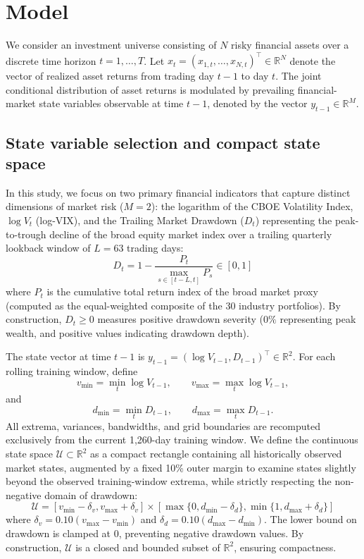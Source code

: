 \documentclass[smallextended]{svjour3}
\begin{document}
\section{Model}
We consider an investment universe consisting of $N$ risky financial assets over a discrete time horizon $t = 1, \dots, T$. Let $x_t = (x_{1,t}, \dots, x_{N,t})^\top \in \mathbb{R}^N$ denote the vector of realized asset returns from trading day $t-1$ to day $t$. The joint conditional distribution of asset returns is modulated by prevailing financial-market state variables observable at time $t-1$, denoted by the vector $y_{t-1} \in \mathbb{R}^M$.

\subsection{State variable selection and compact state space}
In this study, we focus on two primary financial indicators that capture distinct dimensions of market risk ($M = 2$): the logarithm of the CBOE Volatility Index, $\log V_t$ (log-VIX), and the Trailing Market Drawdown ($D_t$) representing the peak-to-trough decline of the broad equity market index over a trailing quarterly lookback window of $L = 63$ trading days:
\begin{equation}
    D_t = 1 - \frac{P_t}{\max_{s \in [t-L, t]} P_s} \in [0, 1]
\end{equation}
where $P_t$ is the cumulative total return index of the broad market proxy (computed as the equal-weighted composite of the 30 industry portfolios). By construction, $D_t \ge 0$ measures positive drawdown severity ($0\%$ representing peak wealth, and positive values indicating drawdown depth).

The state vector at time $t-1$ is $y_{t-1} = (\log V_{t-1}, D_{t-1})^\top \in \mathbb{R}^2$. For each rolling training window, define
\begin{equation}
v_{\min}=\min_t \log V_{t-1},\qquad v_{\max}=\max_t \log V_{t-1},
\end{equation}
and
\begin{equation}
d_{\min}=\min_t D_{t-1},\qquad d_{\max}=\max_t D_{t-1}.
\end{equation}
All extrema, variances, bandwidths, and grid boundaries are recomputed exclusively from the current 1,260-day training window. We define the continuous state space $\mathcal{U} \subset \mathbb{R}^2$ as a compact rectangle containing all historically observed market states, augmented by a fixed 10\% outer margin to examine states slightly beyond the observed training-window extrema, while strictly respecting the non-negative domain of drawdown:
\begin{equation}
    \mathcal{U} = [v_{\min} - \delta_v, v_{\max} + \delta_v] \times [\max\{0, d_{\min} - \delta_d\}, \min\{1, d_{\max} + \delta_d\}]
\end{equation}
where $\delta_v = 0.10 (v_{\max} - v_{\min})$ and $\delta_d = 0.10 (d_{\max} - d_{\min})$. The lower bound on drawdown is clamped at 0, preventing negative drawdown values. By construction, $\mathcal{U}$ is a closed and bounded subset of $\mathbb{R}^2$, ensuring compactness.
\end{document}
